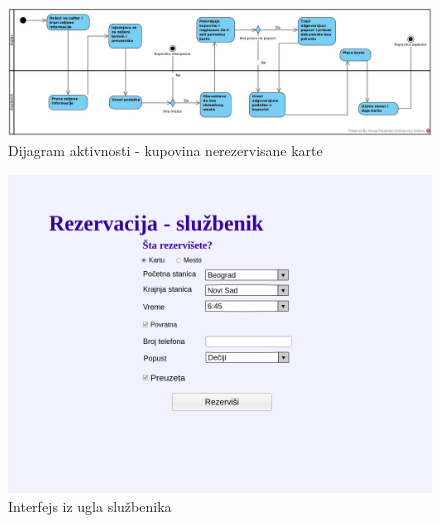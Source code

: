 \begin{figure}[h!tb] 
	\includegraphics[width=1.2\linewidth]{"../Slike/kupovina"}
	\caption{Dijagram aktivnosti - kupovina nerezervisane karte}
	\label{fig:kupovina}
\end{figure}
\begin{figure}[h!tb] 
	\centering
	\includegraphics[width=1.2\linewidth]{../Slike/Veb/rezervacija_sluzbenik.png}
	\caption{Interfejs iz ugla slu\v zbenika}
	\label {fig:rezervacijasluzbenik}
\end{figure}


